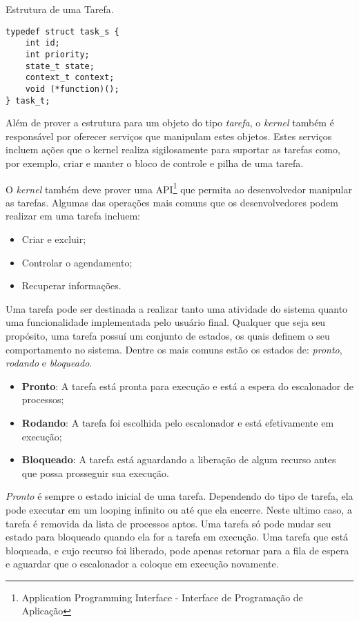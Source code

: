 \begin{listing}
	\label{alg:struct_task}
	\caption{Estrutura de uma Tarefa.}
	\centering
	\begin{verbatim}
typedef struct task_s {
	int id;
	int priority;
	state_t state;
	context_t context;
	void (*function)();	
} task_t;
	\end{verbatim}
\end{listing}

Além de prover a estrutura para um objeto do tipo \emph{tarefa}, o \emph{kernel} também é responsável por oferecer serviços que manipulam estes objetos. Estes serviços incluem ações que o kernel realiza sigilosamente para suportar as tarefas como, por exemplo, criar e manter o bloco de controle e pilha de uma tarefa.

O \emph{kernel} também deve prover uma API\footnote{Application Programming Interface - Interface de Programação de Aplicação} que permita ao desenvolvedor manipular as tarefas. Algumas das operações mais comuns que os desenvolvedores podem realizar em uma tarefa incluem:

\begin{itemize}
	\item Criar e excluir;
	\item Controlar o agendamento;
	\item Recuperar informações.
\end{itemize}

Uma tarefa pode ser destinada a realizar tanto uma atividade do sistema quanto uma funcionalidade implementada pelo usuário final. Qualquer que seja seu propósito, uma tarefa possuí um conjunto de estados, os quais definem o seu comportamento no sistema. Dentre os mais comuns estão os estados de: \emph{pronto}, \emph{rodando} e \emph{bloqueado}.

\begin{itemize}
	\item \textbf{Pronto}: A tarefa está pronta para execução e está a espera do escalonador de processos;
	\item \textbf{Rodando}: A tarefa foi escolhida pelo escalonador e está efetivamente em execução;
	\item \textbf{Bloqueado}: A tarefa está aguardando a liberação de algum recurso antes que possa prosseguir sua execução.
\end{itemize}

\emph{Pronto} é  sempre o estado inicial de uma tarefa. Dependendo do tipo de tarefa, ela pode executar em um looping infinito ou até que ela encerre. Neste ultimo caso, a tarefa é removida da lista de processos aptos. Uma tarefa só pode mudar seu estado para bloqueado quando ela for a tarefa em execução. Uma tarefa que está bloqueada, e cujo recurso foi liberado, pode apenas retornar para a fila de espera e aguardar que o escalonador a coloque em execução novamente.

